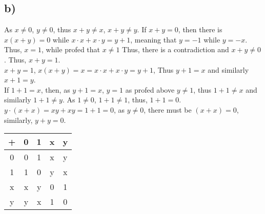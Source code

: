 \documentclass{article}
\begin{document}
\subsection*{b)}
As \(x\neq 0\), \(y\neq 0\), thus \(x+y\neq x\), \(x+y\neq y\). If \(x+y=0\), then there is
\(x(x+y)=0\) while \(x\cdot x + x\cdot y = y+1\), meaning that \(y=-1\) while \(y=-x\). Thus, \(x=1\), while profed that \(x\neq 1\)
Thus, there is a contradiction and \(x+y\neq 0\). Thus, \(x+y=1\).\\
\(x+y=1\), \(x(x+y)=x=x\cdot x + x\cdot y = y+1\), Thus \(y+1=x\) and similarly \( x+1 = y\).\\
If \(1+1 = x\), then, as \(y+1=x\), \(y=1\) as profed above \(y\neq1\), thus \(1+1\neq x\) and similarly \(1+1\neq y\). As \(1\neq 0\), \(1+1\neq 1\),
thus, \(1+1=0\).\\
\(y\cdot(x+x)=xy+xy=1+1=0\), as \(y\neq0\), there must be \((x+x)=0\), similarly, \(y+y=0\).
\begin{table*}[h]
    \centering
    \begin{tabular}{|c|c|c|c|c|}
        \hline
        +&0&1&x&y\\ \hline
        0&0&1&x&y\\ \hline
        1&1&0&y&x\\ \hline
        x&x&y&0&1\\ \hline
        y&y&x&1&0\\ \hline
    \end{tabular}
\end{table*}
\end{document}
